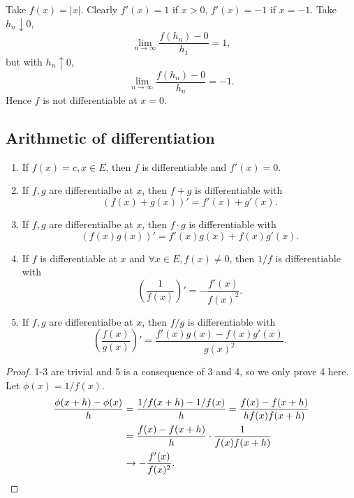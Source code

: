 \begin{example}
    Take $f(x)=|x|$. Clearly $f'(x)=1$ if $x>0$, $f'(x)=-1$ if $x=-1$. Take $ h_n\downarrow 0 $,
    \[
        \lim_{n \to \infty} \frac{f(h_n)-0}{h_1}=1,
    \]
    but with $ h_n \uparrow 0 $,
    \[
        \lim_{n \to \infty} \frac{f(h_n)-0}{h_n}=-1.
    \]
    Hence $f$ is not differentiable at $x=0$.
\end{example}
\subsection{Arithmetic of differentiation}
\begin{proposition}
    \begin{enumerate}
        \item If $f(x)=c,x\in E$, then $f$ is differentiable and $f'(x)=0$.
        \item If $f,g$ are differentialbe at $x$, then $f+g$ is differentiable with
        \[
            (f(x)+g(x))' = f'(x)+g'(x).
        \]
        \item If $f,g$ are differentialbe at $x$, then $f\cdot g$ is differentiable with
        \[
            (f(x)g(x))'=f'(x)g(x)+f(x)g'(x).
        \]
        \item If $f$ is differentiable at $x$ and $ \forall x\in E,f(x)\neq 0 $, then $ 1/f $ is differentiable with 
        \[
            \left( \frac{1}{f(x)} \right)' = -\frac{f'(x)}{f(x)^2}.
        \]
        \item If $f,g$ are differentialbe at $x$, then $f/ g$ is differentiable with
        \[
            \left( \frac{f(x)}{g(x)} \right)' = \frac{f'(x)g(x)-f(x)g'(x)}{g(x)^2}.
        \]
    \end{enumerate}
\end{proposition}
\begin{proof}
    1-3 are trivial and 5 is a consequence of 3 and 4, so we only prove 4 here. Let $ \phi(x) = 1/f(x) $. 
    \begin{align*}
        \frac{\phi(x+h)-\phi(x)}{h} &= \frac{1/f(x+h)-1/f(x)}{h}=\frac{f(x)-f(x+h)}{hf(x)f(x+h)}  \\ 
        &= \frac{f(x)-f(x+h)}{h}\cdot \frac{1}{f(x)f(x+h)}\\ 
        &\to -\frac{f'(x)}{f(x)^2}.\qedhere
    \end{align*}
\end{proof}

